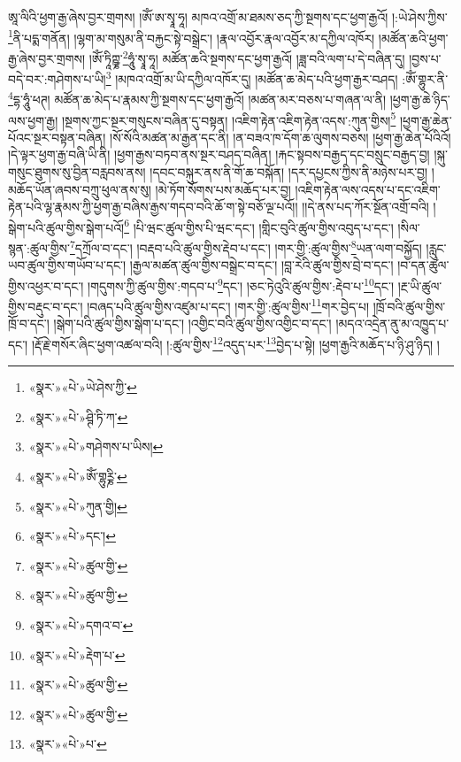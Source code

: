 ཨཱ་ལིའི་ཕྱག་རྒྱ་ཞེས་བྱར་གྲགས། །ཨོཾ་ཨ་སྭཱ་ཧཱ། མཁའ་འགྲོ་མ་ཐམས་ཅད་ཀྱི་སྔགས་དང་ཕྱག་རྒྱའོ། །:ཡེ་ཤེས་ཀྱིས་\footnote{«སྣར་»«པེ་»ཡེ་ཤེས་ཀྱི་}ནི་པདྨ་གནོན། །ལྷག་མ་གསུམ་ནི་བརྐྱང་སྟེ་བསྒྲེང་། །རྣལ་འབྱོར་རྣལ་འབྱོར་མ་དཀྱིལ་འཁོར། །མཚོན་ཆའི་ཕྱག་རྒྱ་ཞེས་བྱར་གྲགས། །ཨོཾ་ཏཱིཀྵྞ་\footnote{«སྣར་»«པེ་»ཤྚི་ཏི་ཀ་}ཧཱུཾ་སྭཱ་ཧཱ། མཚོན་ཆའི་སྔགས་དང་ཕྱག་རྒྱའོ། །ཟླ་བའི་ལག་པ་དེ་བཞིན་དུ། །བྱས་པ་བདེ་བར་:གཤེགས་པ་ཡི།\footnote{«སྣར་»«པེ་»གཤེགས་པ་ཡིས།} །མཁའ་འགྲོ་མ་ཡི་དཀྱིལ་འཁོར་དུ། །མཚོན་ཆ་མེད་པའི་ཕྱག་རྒྱར་བཤད། :ཨོཾ་གྷུར་ནི་\footnote{«སྣར་»«པེ་»ཨོཾ་གྷུཪྞི་}དྷ་ཧཱུཾ་ཕཊ། མཚོན་ཆ་མེད་པ་རྣམས་ཀྱི་སྔགས་དང་ཕྱག་རྒྱའོ། །མཚན་མར་བཅས་པ་གཞན་ལ་ནི། །ཕྱག་རྒྱ་ཆེ་ཉིད་ལས་ཕྱག་རྒྱ། །སྔགས་ཀྱང་སྔར་གསུངས་བཞིན་དུ་བསྟན། །འཇིག་རྟེན་འཇིག་རྟེན་འདས་:ཀུན་གྱིས།\footnote{«སྣར་»«པེ་»ཀུན་གྱི།} །ཕྱག་རྒྱ་ཆེན་པོའང་སྔར་བསྟན་བཞིན། །སོ་སོའི་མཚན་མ་རྒྱན་དང་ནི། །ན་བཟའ་ཁ་དོག་ཆ་ལུགས་བཅས། །ཕྱག་རྒྱ་ཆེན་པོའིའོ། །དེ་ལྟར་ཕྱག་རྒྱ་བཞི་ཡི་ནི། །ཕྱག་རྒྱས་བཏབ་ནས་སྔར་བཤད་བཞིན། །རྐང་སྟབས་བརྒྱད་དང་བསྲུང་བརྒྱད་བྱ། །སྐུ་གསུང་ཐུགས་སུ་བྱིན་བརླབས་ནས། །དབང་བསྐུར་ནས་ནི་གོ་ཆ་བསྐོན། །དར་དཔྱངས་ཀྱིས་ནི་མཉེས་པར་བྱ། །མཆོད་ཡོན་ཞབས་བཀྲུ་ཕུལ་ནས་སུ། །མེ་ཏོག་སོགས་པས་མཆོད་པར་བྱ། །འཇིག་རྟེན་ལས་འདས་པ་དང་འཇིག་རྟེན་པའི་ལྷ་རྣམས་ཀྱི་ཕྱག་རྒྱ་བཞིས་རྒྱས་གདབ་བའི་ཆོ་ག་སྟེ་བཅོ་ལྔ་པའོ།། །།དེ་ནས་པད་ཀོར་སྔོན་འགྲོ་བའི། །སྒེག་པའི་ཚུལ་གྱིས་སྒེག་པའོ།\footnote{«སྣར་»«པེ་»དང་།} །པི་ཝང་ཚུལ་གྱིས་པི་ཝང་དང་། །གླིང་བུའི་ཚུལ་གྱིས་འབུད་པ་དང་། །སིལ་སྙན་:ཚུལ་གྱིས་\footnote{«སྣར་»«པེ་»ཚུལ་གྱི་}དཀྲོལ་བ་དང་། །བརྡབ་པའི་ཚུལ་གྱིས་རྡེབ་པ་དང་། །གར་གྱི་:ཚུལ་གྱིས་\footnote{«སྣར་»«པེ་»ཚུལ་གྱི་}ཡན་ལག་བསྐྱོད། །རླུང་ཡབ་ཚུལ་གྱིས་གཡོབ་པ་དང་། །རྒྱལ་མཚན་ཚུལ་གྱིས་བསྒྲེང་བ་དང་། །བླ་རེའི་ཚུལ་གྱིས་བྲེ་བ་དང་། །བ་དན་ཚུལ་གྱིས་འཕྱར་བ་དང་། །གདུགས་ཀྱི་ཚུལ་གྱིས་:གདབ་པ་\footnote{«སྣར་»«པེ་»དགའ་བ་}དང་། །ཅང་ཏེའུའི་ཚུལ་གྱིས་:རྡེབ་པ་\footnote{«སྣར་»«པེ་»རྡེག་པ་}དང་། །རྔ་ཡི་ཚུལ་གྱིས་བརྡུང་བ་དང་། །བཞད་པའི་ཚུལ་གྱིས་འཛུམ་པ་དང་། །གར་གྱི་:ཚུལ་གྱིས་\footnote{«སྣར་»«པེ་»ཚུལ་གྱི་}གར་བྱེད་པ། །ཁྲོ་བའི་ཚུལ་གྱིས་ཁྲོ་བ་དང་། །སྒེག་པའི་ཚུལ་གྱིས་སྒེག་པ་དང་། །འགྱིང་བའི་ཚུལ་གྱིས་འགྱིང་བ་དང་། །མདའ་འདྲེན་ནུ་མ་འཁྱུད་པ་དང་། །རྡོ་རྗེ་གསོར་ཞིང་ཕྱག་འཚལ་བའི། །:ཚུལ་གྱིས་\footnote{«སྣར་»«པེ་»ཚུལ་གྱི་}འདུད་པར་\footnote{«སྣར་»«པེ་»པ་}བྱེད་པ་སྟེ། །ཕྱག་རྒྱའི་མཆོད་པ་ཉི་ཤུ་ཉིད། །

